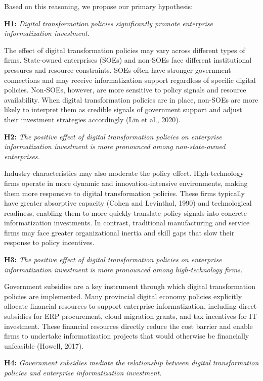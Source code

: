 \documentclass[12pt]{article}
\begin{document}
Based on this reasoning, we propose our primary hypothesis:

\noindent\textbf{H1:} \textit{Digital transformation policies significantly promote enterprise informatization investment.}

The effect of digital transformation policies may vary across different types of firms. State-owned enterprises (SOEs) and non-SOEs face different institutional pressures and resource constraints. SOEs often have stronger government connections and may receive informatization support regardless of specific digital policies. Non-SOEs, however, are more sensitive to policy signals and resource availability. When digital transformation policies are in place, non-SOEs are more likely to interpret them as credible signals of government support and adjust their investment strategies accordingly (Lin et al., 2020).

\noindent\textbf{H2:} \textit{The positive effect of digital transformation policies on enterprise informatization investment is more pronounced among non-state-owned enterprises.}

Industry characteristics may also moderate the policy effect. High-technology firms operate in more dynamic and innovation-intensive environments, making them more responsive to digital transformation policies. These firms typically have greater absorptive capacity (Cohen and Levinthal, 1990) and technological readiness, enabling them to more quickly translate policy signals into concrete informatization investments. In contrast, traditional manufacturing and service firms may face greater organizational inertia and skill gaps that slow their response to policy incentives.

\noindent\textbf{H3:} \textit{The positive effect of digital transformation policies on enterprise informatization investment is more pronounced among high-technology firms.}

Government subsidies are a key instrument through which digital transformation policies are implemented. Many provincial digital economy policies explicitly allocate financial resources to support enterprise informatization, including direct subsidies for ERP procurement, cloud migration grants, and tax incentives for IT investment. These financial resources directly reduce the cost barrier and enable firms to undertake informatization projects that would otherwise be financially unfeasible (Howell, 2017).

\noindent\textbf{H4:} \textit{Government subsidies mediate the relationship between digital transformation policies and enterprise informatization investment.}
\end{document}
